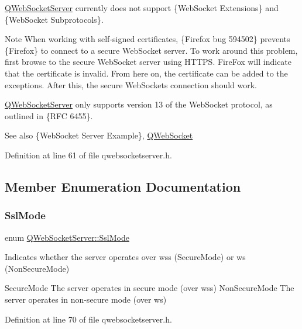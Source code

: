\mbox{\hyperlink{class_q_web_socket_server}{Q\+Web\+Socket\+Server}} currently does not support  \{Web\+Socket Extensions\} and  \{Web\+Socket Subprotocols\}.

\begin{DoxyNote}{Note}
When working with self-\/signed certificates, \{Firefox bug 594502\} prevents \{Firefox\} to connect to a secure Web\+Socket server. To work around this problem, first browse to the secure Web\+Socket server using H\+T\+T\+PS. Fire\+Fox will indicate that the certificate is invalid. From here on, the certificate can be added to the exceptions. After this, the secure Web\+Sockets connection should work.
\end{DoxyNote}
\mbox{\hyperlink{class_q_web_socket_server}{Q\+Web\+Socket\+Server}} only supports version 13 of the Web\+Socket protocol, as outlined in \{R\+FC 6455\}.

\begin{DoxySeeAlso}{See also}
\{Web\+Socket Server Example\}, \mbox{\hyperlink{class_q_web_socket}{Q\+Web\+Socket}} 
\end{DoxySeeAlso}


Definition at line 61 of file qwebsocketserver.\+h.



\subsection{Member Enumeration Documentation}
\mbox{\label{class_q_web_socket_server_a07ce392fd4fa351746e48b00428366b8}} 
\subsubsection{\texorpdfstring{Ssl\+Mode}{SslMode}}
{\footnotesize\ttfamily enum \mbox{\hyperlink{class_q_web_socket_server_a07ce392fd4fa351746e48b00428366b8}{Q\+Web\+Socket\+Server\+::\+Ssl\+Mode}}}

Indicates whether the server operates over wss (Secure\+Mode) or ws (Non\+Secure\+Mode)

Secure\+Mode The server operates in secure mode (over wss)  Non\+Secure\+Mode The server operates in non-\/secure mode (over ws) 

Definition at line 70 of file qwebsocketserver.\+h.



